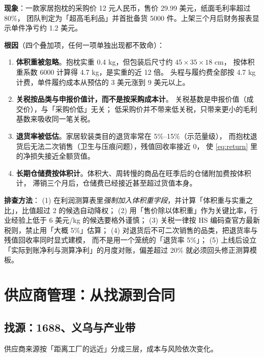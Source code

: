 \begin{pitfall}
\textbf{现象}：一款家居抱枕的采购价 12 元人民币，售价 29.99 美元，纸面毛利率超过 80\%，
团队判定为「超高毛利品」并首批备货 5000 件。上架三个月后财务报表显示单件净亏约 1.2 美元。

\textbf{根因}（四个叠加项，任何一项单独出现都不致命）：
\begin{enumerate}
  \item \textbf{体积重被忽略}。抱枕实重 0.4 kg，但包装后尺寸约 $45\times35\times18$ cm，
        按体积重系数 6000 计算得 4.7 kg，是实重的近 12 倍。
        头程与履约费全部按 4.7 kg 计费，单件履约成本从预估的 3 美元涨到 9 美元以上。
  \item \textbf{关税按品类与申报价值计，而不是按采购成本计}。
        关税基数是申报价值（成交价），与「采购价低」无关；
        低采购价并不带来低关税，只带来更小的毛利基数来吸收同一笔关税。
  \item \textbf{退货率被低估}。家居软装类目的退货率常在 5\%--15\%（示范量级），
        而抱枕退货后无法二次销售（卫生与压痕问题），残值回收率接近 0，
        使 \cref{eq:return} 里的净损失接近全额货值。
  \item \textbf{长期仓储费按体积计}。体积大、周转慢的商品在旺季后的仓储附加费按体积计，
        滞销三个月后，仓储费已经接近甚至超过货值本身。
\end{enumerate}

\textbf{排查方法}：
(1) 在利润测算表里\emph{强制加入体积重字段}，并计算「体积重与实重之比」，比值超过 2 的候选自动降权；
(2) 用「售价除以体积重」作为关键比率，行业经验上低于 6 美元/kg 的候选要格外谨慎；
(3) 关税一律按 HS 编码查官方最新税则，禁止用「大概 5\%」估算；
(4) 对退货后不可二次销售的品类，把退货率与残值回收率同时显式建模，
而不是用一个笼统的「退货率 5\%」；
(5) 上线后设立「实际到账净利与测算净利」的月度对账，偏差超过 20\% 就必须回头修正测算模板。
\end{pitfall}

\section{供应商管理：从找源到合同}
\label{sec:sup-supplier}

\subsection{找源：1688、义乌与产业带}

供应商来源按「距离工厂的远近」分成三层，成本与风险依次变化。

